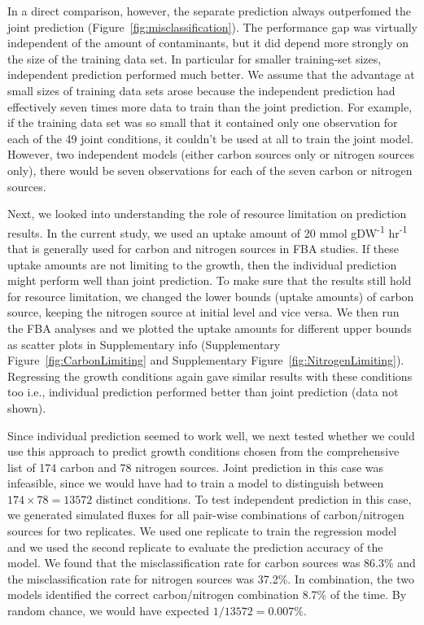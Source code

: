 \documentclass[12pt]{article}
\begin{document}
In a direct comparison, however, the separate prediction always outperfomed the joint prediction (Figure~\ref{fig:misclassification}). The performance gap was virtually independent of the amount of contaminants, but it did depend more strongly on the size of the training data set. In particular for smaller training-set sizes, independent prediction performed much better. We assume that the advantage at small sizes of training data sets arose because the independent prediction had effectively seven times more data to train than the joint prediction. For example, if the training data set was so small that it contained only one observation for each of the 49 joint conditions, it couldn't be used at all to train the joint model. However, two independent models (either carbon sources only or nitrogen sources only), there would be seven observations for each of the seven carbon or nitrogen sources.

Next, we looked into understanding the role of resource limitation on prediction results. In the current study, we used an uptake amount of 20 mmol gDW\textsuperscript{-1} hr\textsuperscript{-1} that is generally used for carbon and nitrogen sources in FBA studies. If these uptake amounts are not limiting to the growth, then the individual prediction might perform well than joint prediction. To make sure that the results still hold for resource limitation, we changed the lower bounds (uptake amounts) of carbon source, keeping the nitrogen source at initial level and vice versa. We then run the FBA analyses and we plotted the uptake amounts for different upper bounds as scatter plots in Supplementary info (Supplementary Figure~\ref{fig:CarbonLimiting} and Supplementary Figure~\ref{fig:NitrogenLimiting}). Regressing the growth conditions again gave similar results with these conditions too i.e., individual prediction performed better than joint prediction (data not shown).

Since individual prediction seemed to work well, we next tested whether we could use this approach to predict growth conditions chosen from the comprehensive list of 174 carbon and 78 nitrogen sources. Joint prediction in this case was infeasible, since we would have had to train a model to distinguish between $174\times78=13572$ distinct conditions. To test independent prediction in this case, we generated simulated fluxes for all pair-wise combinations of carbon/nitrogen sources for two replicates. We used one replicate to train the regression model and we used the second replicate to evaluate the prediction accuracy of the model. We found that the misclassification rate for carbon sources was 86.3\% and the misclassification rate for nitrogen sources was 37.2\%. In combination, the two models identified the correct carbon/nitrogen combination 8.7\% of the time. By random chance, we would have expected $1/13572=0.007\%$.
\end{document}
